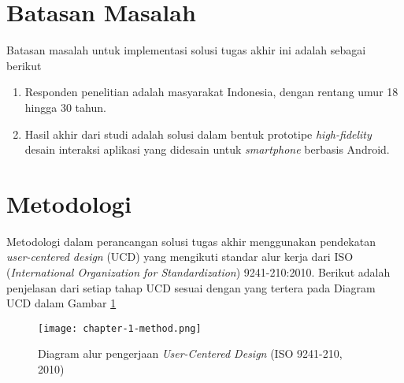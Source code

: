 \section{Batasan Masalah}

Batasan masalah untuk implementasi solusi tugas akhir ini adalah sebagai berikut
\begin{enumerate}
  \item Responden penelitian adalah masyarakat Indonesia, dengan rentang umur 18 hingga 30 tahun.
  \item Hasil akhir dari studi adalah solusi dalam bentuk prototipe \textit{high-fidelity} desain interaksi aplikasi yang didesain untuk \textit{smartphone} berbasis Android.
\end{enumerate}

\section{Metodologi}
\label{sec:metodologi}

Metodologi dalam perancangan solusi tugas akhir menggunakan pendekatan \textit{user-centered design} (UCD) yang mengikuti standar alur kerja dari ISO (\textit{International Organization for Standardization}) 9241-210:2010. Berikut adalah penjelasan dari setiap tahap UCD sesuai dengan yang tertera pada Diagram UCD dalam Gambar \ref{fig:diagram_iso1}


\begin{figure}[h]
  \centering
  \texttt{[image: chapter-1-method.png]}
  \caption{Diagram alur pengerjaan \textit{User-Centered Design} (ISO 9241-210, 2010)}
  \label{fig:diagram_iso1}
\end{figure}

